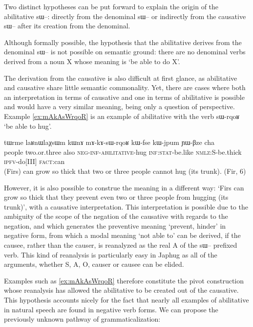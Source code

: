 \documentclass[oldfontcommands,oneside,a4paper,11pt]{article}
\newcommand{\ipa}[1]{{\phon \mbox{#1}}} %
\begin{document}
Two distinct hypotheses can be put forward to explain the origin of the abilitative \ipa{sɯ--}: directly from the denominal \ipa{sɯ--} or indirectly from the causative \ipa{sɯ--} after its creation from the denominal. 

Although formally possible, the hypothesis that the abilitative derives from the denominal \ipa{sɯ--} is not possible on semantic ground: there are no denominal verbs derived from a noun X whose meaning is `be able to do X'.

The derivation from the causative is also difficult at first glance, as abilitative and causative share little semantic commonality. Yet, there are cases where both an interpretation in terms of causative and one in terms of abilitative is possible and would have a very similar meaning, being only a question of perspective. Example \ref{ex:mAkAsWrqoR} is an example of abilitative with the verb \ipa{sɯ-rqoʁ} `be able to hug'.


 \begin{exe}
\ex \label{ex:mAkAsWrqoR}
\gll
\ipa{tɯrme} 	\ipa{laʁnɯlaχsɯm} 	\ipa{kɯnɤ} 	\ipa{mɤ-kɤ-sɯ-rqoʁ} 	\ipa{kɯ-fse} 	\ipa{kɯ-jpum} 	\ipa{ɲɯ-βze} 	\ipa{cha} \\
people two.or.three also \textsc{neg-inf-abilitative}-hug \textsc{inf:stat}-be.like \textsc{nmlz:S}-be.thick \textsc{ipfv}-do[III] \textsc{fact}:can \\
\glt  (Firs) can grow so thick that two or three people  cannot hug (its trunk). (Fir, 6)
   \end{exe}

However, it is also possible to construe the meaning in a different way: `Firs can grow so thick that they prevent even two or three people from hugging (its trunk)', with a causative interpretation. This interpretation is possible due to the ambiguity of the scope of the negation of the causative with regards to the negation, and which generates the preventive meaning `prevent, hinder' in negative form, from which a modal meaning `not able to' can be derived, if the causee, rather than the causer, is reanalyzed as the real A of the \ipa{sɯ--} prefixed verb. This kind of reanalysis is particularly easy in Japhug as all of the arguments, whether S, A, O, causer or causee can be elided.

Examples such as \ref{ex:mAkAsWrqoR} therefore constitute the pivot construction whose reanalysis has allowed the abilitative to be created out of the causative. This hypothesis accounts nicely for the fact that nearly all examples of abilitative in natural speech are found in negative verb forms. We can propose the previously unknown pathway of grammaticalization:
\end{document}

